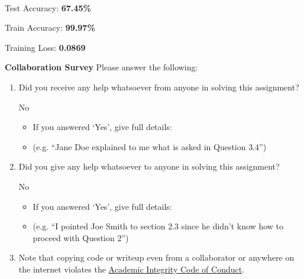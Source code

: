 \documentclass[11pt,addpoints,answers]{exam}
\numberwithin{equation}{section} %
\numberwithin{figure}{section} %
\numberwithin{table}{section} %
\begin{document}
\begin{solution}
\\ 
Test Accuracy: \textbf{67.45\%}

Train Accuracy: \textbf{99.97\%}

Training Loss: \textbf{0.0869}

\end{solution}

\clearpage

\textbf{Collaboration Survey} Please answer the following:

\begin{enumerate}
    \item Did you receive any help whatsoever from anyone in solving this assignment?
    \begin{checkboxes}
     \choice No
    \end{checkboxes}
    \begin{itemize}
        \item If you answered `Yes', give full details:
        \item (e.g. “Jane Doe explained to me what is asked in Question 3.4”)
    \end{itemize}

    \begin{tcolorbox}[fit,height=3cm,blank, borderline={1pt}{-2pt},nobeforeafter]
    \end{tcolorbox}

    \item Did you give any help whatsoever to anyone in solving this assignment?
    \begin{checkboxes}
     \choice No\
    \end{checkboxes}
    \begin{itemize}
        \item If you answered `Yes', give full details:
        \item (e.g. “I pointed Joe Smith to section 2.3 since he didn’t know how to proceed with Question 2”)
    \end{itemize}

    \begin{tcolorbox}[fit,height=3cm,blank, borderline={1pt}{-2pt},nobeforeafter]
    \end{tcolorbox}

    \item Note that copying code or writeup even from a collaborator or anywhere on the internet violates the \href{hhttps://www.cmu.edu/policies/student-and-student-life/academic-integrity.html}{Academic Integrity Code of Conduct}.
\end{enumerate}
\end{document}
